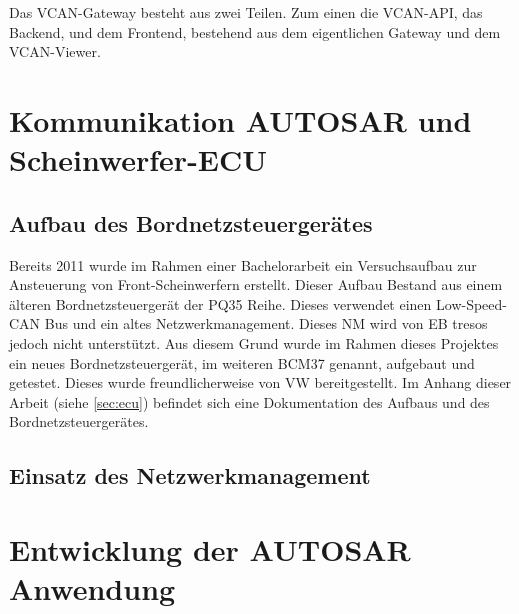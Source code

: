 \documentclass[
  a4paper,					    %
  twoside,
  DIV=calc,     				%
  bibliography=totoc,
  cleardoublepage=empty,
  ngerman,     					%
  final       					%
]{scrbook}
\begin{document}
Das VCAN-Gateway besteht aus zwei Teilen. Zum einen die VCAN-API, das Backend, und dem Frontend, bestehend aus dem eigentlichen Gateway und dem VCAN-Viewer.













\section{Kommunikation AUTOSAR und Scheinwerfer-ECU}
\label{sec:Kommunikation_A_S}

\subsection{Aufbau des Bordnetzsteuergerätes}
\label{sec:Aufbau_der_ECU}
Bereits 2011 wurde im Rahmen einer Bachelorarbeit ein Versuchsaufbau zur Ansteuerung von Front-Scheinwerfern erstellt. Dieser Aufbau Bestand aus einem älteren Bordnetzsteuergerät der PQ35 Reihe. Dieses verwendet einen Low-Speed-CAN Bus und ein altes Netzwerkmanagement. Dieses NM wird von EB tresos jedoch nicht unterstützt. Aus diesem Grund wurde im Rahmen dieses Projektes ein neues Bordnetzsteuergerät, im weiteren BCM37 genannt, aufgebaut und getestet. Dieses wurde freundlicherweise von VW bereitgestellt. Im Anhang dieser Arbeit (siehe \ref{sec:ecu}) befindet sich eine Dokumentation des Aufbaus und des Bordnetzsteuergerätes.



\subsection{Einsatz des Netzwerkmanagement}
\label{sec:AutosarNM}







\section{Entwicklung der AUTOSAR Anwendung}
\label{sec:entwicklung_autosar}
\end{document}
